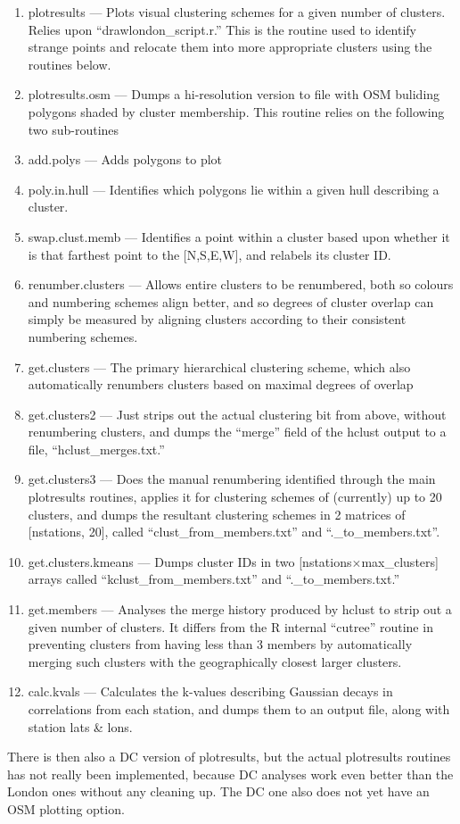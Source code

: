 \documentclass[a4paper,oneside]{article}
\begin{document}
\begin{enumerate}
    \item{plotresults --- Plots visual clustering schemes for a given number of clusters. Relies upon ``drawlondon\_script.r.'' This is the
        routine used to identify strange points and relocate them into more appropriate clusters using the routines below.}
    \item{plotresults.osm} --- Dumps a hi-resolution version to file with OSM buliding polygons shaded by cluster membership. This routine
        relies on the following two sub-routines
    \item{add.polys} --- Adds polygons to plot
    \item{poly.in.hull} --- Identifies which polygons lie within a given hull describing a cluster.
    \item{swap.clust.memb --- Identifies a point within a cluster based upon whether it is that farthest point to the [N,S,E,W], and relabels
        its cluster ID.}
    \item{renumber.clusters --- Allows entire clusters to be renumbered, both so colours and numbering schemes align better, and so degrees of
        cluster overlap can simply be measured by aligning clusters according to their consistent numbering schemes.}
    \item{get.clusters --- The primary hierarchical clustering scheme, which also automatically renumbers clusters based on maximal degrees of
        overlap}
    \item{get.clusters2 --- Just strips out the actual clustering bit from above, without renumbering clusters, and dumps the ``merge'' field of
        the hclust output to a file, ``hclust\_merges.txt.''}
    \item{get.clusters3 --- Does the manual renumbering identified through the main plotresults routines, applies it for clustering schemes of
        (currently) up to 20 clusters, and dumps the resultant clustering schemes in 2 matrices of [nstations, 20], called
        ``clust\_from\_members.txt'' and ``.\_to\_members.txt''.}
    \item{get.clusters.kmeans --- Dumps cluster IDs in two [nstations$\times$max\_clusters] arrays called ``kclust\_from\_members.txt'' and
        ``.\_to\_members.txt.''}
    \item{get.members --- Analyses the merge history produced by hclust to strip out a given number of clusters. It differs from the R internal
        ``cutree'' routine in preventing clusters from having less than 3 members by automatically merging such clusters with the geographically
        closest larger clusters.}
    \item{calc.kvals --- Calculates the k-values describing Gaussian decays in correlations from each station, and dumps them to an output file,
        along with station lats \& lons.}
\end{enumerate}
There is then also a DC version of plotresults, but the actual plotresults routines has not really been implemented, because DC analyses work
even better than the London ones without any cleaning up. The DC one also does not yet have an OSM plotting option.
\end{document}
